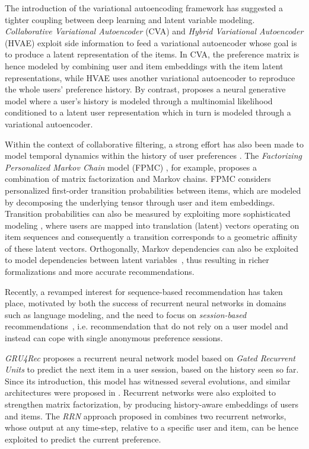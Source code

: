 \documentclass[sigconf]{acmart}
\numberwithin{equation}{section}
\begin{document}
The introduction of the variational autoencoding framework
\cite{kingma14,RezendeMW14} has suggested a tighter coupling
between deep learning and latent variable modeling.
\emph{Collaborative Variational Autoencoder} (CVA) \cite{Li:2017} and
\emph{Hybrid Variational Autoencoder} (HVAE)
\cite{2018arXiv180801006G} exploit side information to feed a
variational autoencoder whose goal is to produce a latent
representation of the items. In CVA, the preference matrix is hence
modeled by combining user and item embeddings with the item
latent representations, while HVAE uses another variational
autoencoder to reproduce the whole users' preference history. 
By contrast, 
\cite{Liang:2018:VAC:3178876.3186150} proposes a neural generative
model where a user's history is modeled through a multinomial
likelihood conditioned to a latent user representation which in turn
is modeled through a variational autoencoder.



Within the context of collaborative filtering, a strong effort has
also been made to model temporal dynamics within the history of user preferences
\cite{Quadrana:2018}. 
The \emph{Factorizing Personalized Markov Chain} model (FPMC)
\cite{Rendle:2010}, for example, proposes a combination of matrix
factorization and Markov chains. FPMC considers personalized
first-order transition probabilities between items, which are modeled
by decomposing the underlying tensor through user and item
embeddings.
Transition probabilities can also be measured by exploiting more
sophisticated modeling \cite{HeM16,He:2017}, where users are mapped into 
translation (latent) vectors operating on item sequences and
consequently a transition corresponds to a geometric affinity of these
latent vectors. 
Orthogonally, Markov dependencies can also be exploited to model
dependencies between latent variables~\cite{Barbieri:2013}, thus
resulting in richer formalizations and more accurate recommendations. 

Recently, a revamped interest for sequence-based recommendation has
taken place, motivated by both the success of recurrent neural
networks \cite{Cho14,Greff:2017} in domains such as language modeling,
and the need to focus on \emph{session-based} 
recommendations~\cite{Hidasi:2016, Tan16}, i.e. recommendation that do not rely 
on a user model and instead can cope with single anonymous preference
sessions. 

\emph{GRU4Rec} \cite{Hidasi:2016} proposes a recurrent neural network
model based on \emph{Gated Recurrent Units} to predict the next item
in a user session, based on the history seen so far. Since its
introduction, this model has witnessed several evolutions, and similar
architectures were proposed in
\cite{Devooght:2017,Liu:2016,Twardowski:2016, Wu16,Tan16,Jannach:2017,Quadrana:2017}.
Recurrent networks were also exploited to strengthen matrix
factorization, by producing history-aware embeddings of users and
items. The \emph{RRN} approach proposed in \cite{Wu:2017} combines two
recurrent networks, whose output at any time-step, relative to a specific
user and item, can be hence exploited to predict the current
preference.
\end{document}

